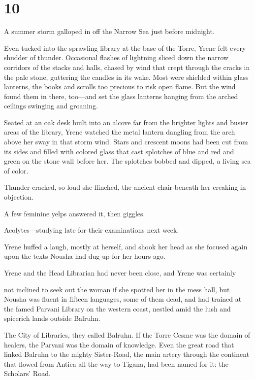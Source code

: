 
\chapter{10}

A summer storm galloped in off the Narrow Sea just before midnight.

Even tucked into the sprawling library at the base of the Torre, Yrene felt every shudder of thunder. Occasional flashes of lightning sliced down the narrow corridors of the stacks and halls, chased by wind that crept through the cracks in the pale stone, guttering the candles in its wake. Most were shielded within glass lanterns, the books and scrolls too precious to risk open flame. But the wind found them in there, too---and set the glass lanterns hanging from the arched ceilings swinging and groaning.

Seated at an oak desk built into an alcove far from the brighter lights and busier areas of the library, Yrene watched the metal lantern dangling from the arch above her sway in that storm wind. Stars and crescent moons had been cut from its sides and filled with colored glass that cast splotches of blue and red and green on the stone wall before her. The splotches bobbed and dipped, a living sea of color.

Thunder cracked, so loud she flinched, the ancient chair beneath her creaking in objection.

A few feminine yelps answered it, then giggles.

Acolytes---studying late for their examinations next week.

Yrene huffed a laugh, mostly at herself, and shook her head as she focused again upon the texts Nousha had dug up for her hours ago.

Yrene and the Head Librarian had never been close, and Yrene was certainly

not inclined to seek out the woman if she spotted her in the mess hall, but  Nousha was fluent in fifteen languages, some of them dead, and had trained at the famed Parvani Library on the western coast, nestled amid the lush and spicerich lands outside Balruhn.

The City of Libraries, they called Balruhn. If the Torre Cesme was the domain of healers, the Parvani was the domain of knowledge. Even the great road that linked Balruhn to the mighty Sister-Road, the main artery through the continent that flowed from Antica all the way to Tigana, had been named for it: the Scholars' Road.

